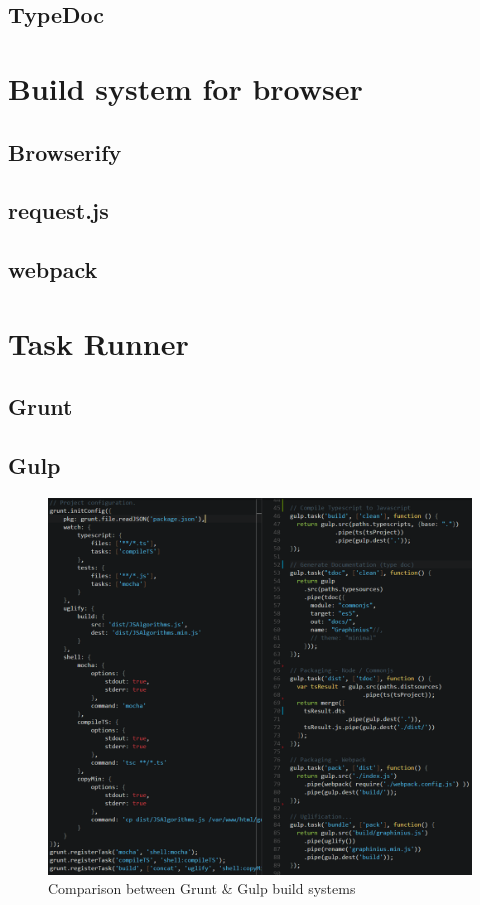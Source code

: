 	\subsection{TypeDoc}
	\label{ssect:typedoc}
	

\section{Build system for browser}
	\label{sect:build_browser}
	
	\subsection{Browserify}
	\label{ssect:browserify}
	
	\subsection{request.js}
	\label{ssect:request_js}
	
	\subsection{webpack}
	\label{ssect:webpack}


\section{Task Runner}
\label{sect:build_system}

	\subsection{Grunt}
	\label{ssect:grunt}
	
	\subsection{Gulp}
	\label{ssect:gulp}
	
	\begin{figure}[ht]
		\label{fig_grunt_gulp}
		\centering
		\hspace*{-1.4cm}
		\includegraphics[width=1.2\textwidth]{figures/grunt_gulp_comparison}
		\caption{Comparison between Grunt \& Gulp build systems}
	\end{figure}
	


